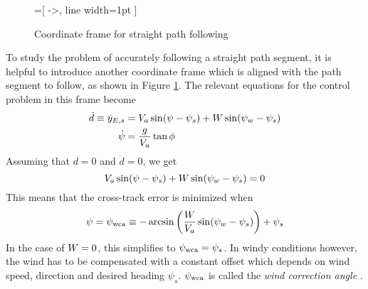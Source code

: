 \begin{figure}
    \begin{center}
        =[
            ->,
            line width=1pt
            ]
    \end{center}
    \caption{Coordinate frame for straight path following}
    \label{fig:coord_straight}
\end{figure}

To study the problem of accurately following a straight path segment, it is helpful to introduce another 
coordinate frame which is aligned with the path segment to follow, as shown in Figure \ref{fig:coord_straight}. The relevant equations for the control problem in this frame become
\begin{align}
    \dot{d}\equiv\dot{y}_{E,s} &= V_a\sin(\psi-\psi_s) + W\sin(\psi_w-\psi_s)\\
    \dot{\psi} &= \frac{g}{V_a}\tan\phi
\end{align}
Assuming that $d=0$ and $\dot{d}=0$, we get
\begin{equation}
    V_a\sin(\psi-\psi_s) + W\sin(\psi_w-\psi_s)=0
\end{equation}
This means that the cross-track error is minimized when
\begin{equation}\label{eq:wca}
    \psi=\psi_{\text{wca}}\equiv-\arcsin\left(\frac{W}{V_a}\sin(\psi_w-\psi_s)\right) + \psi_s
\end{equation}
In the case of $W=0$, this simplifies to $\psi_{\text{wca}}=\psi_s$. In windy conditions however, the wind 
has to be compensated with a constant offset which depends on wind speed, direction and desired 
heading $\psi_s$. $\psi_{\text{wca}}$ is called the \textit{wind correction angle} \cite{uav_dynamics_wind}.


